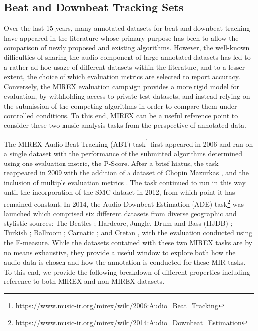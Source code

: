 \subsection{Beat and Downbeat Tracking Sets}

Over the last 15 years, many annotated datasets for beat and downbeat tracking have appeared in the literature whose primary purpose has been to allow the comparison of newly proposed and existing algorithms. However, the well-known difficulties of sharing the audio component of large annotated datasets has led to a rather ad-hoc usage of different datasets within the literature, and to a lesser extent, the choice of which evaluation metrics are selected to report accuracy. Conversely, the MIREX evaluation campaign provides a more rigid model for evaluation, by withholding access to private test datasets, and instead relying on the submission of the competing algorithms in order to compare them under controlled conditions. To this end, MIREX can be a useful reference point to consider these two music analysis tasks from the perspective of annotated data.  

The MIREX Audio Beat Tracking (ABT) task\footnote{https://www.music-ir.org/mirex/wiki/2006:Audio\_Beat\_Tracking} first appeared in 2006 and ran on a single dataset \cite{moelants04icmpc,mckinney07jnmr} with the performance of the submitted algorithms determined using one evaluation metric, the P-Score. After a brief hiatus, the task reappeared in 2009 with the addition of a dataset of Chopin Mazurkas \cite{sapp07ismir}, and the inclusion of multiple evaluation metrics \cite{davies09techreport}. The task continued to run in this way until the incorporation of the SMC dataset \cite{holzapfel12taslp} in 2012, from which point it has remained constant. In 2014, the Audio Downbeat Estimation (ADE) task\footnote{https://www.music-ir.org/mirex/wiki/2014:Audio\_Downbeat\_Estimation} was launched which comprised six different datasets from diverse geographic and stylistic sources: The Beatles \cite{Mauch2009a}; Hardcore, Jungle, Drum and Bass (HJDB) \cite{hockman12ismir}; Turkish \cite{srinivasamurthy14jnmr}; Ballroom \cite{krebs13ismir}; Carnatic \cite{srinivasamurthy14icassp}; and Cretan \cite{holzapfel14ismir}, with the evaluation conducted using the F-measure. While the datasets contained with these two MIREX tasks are by no means exhaustive, they provide a useful window to explore both how the audio data is chosen and how the annotation is conducted for these MIR tasks. To this end, we provide the following breakdown of different properties including reference to both MIREX and non-MIREX datasets. 


